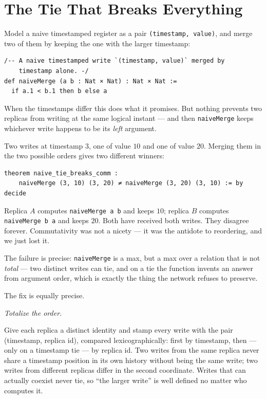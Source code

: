 \documentclass[12pt, a4paper, openright]{book}
\theoremstyle{thmstyle}
\theoremstyle{defstyle}
\newcommand{\lc}[1]{\texttt{#1}}
\newcounter{refutation}[chapter]
\renewcommand{\therefutation}{\thechapter.\arabic{refutation}}
\newenvironment{refutedbox}[1]{%
  \refstepcounter{refutation}%
  \begin{tcolorbox}[refutedbox,
    title={Refuted \therefutation\ --- #1}]%
}{\end{tcolorbox}}
\begin{document}
\section{The Tie That Breaks Everything}
\label{sec:lww-tie}

Model a naive timestamped register as a pair \lc{(timestamp, value)},
and merge two of them by keeping the one with the larger timestamp:

\begin{verbatim}
/-- A naive timestamped write `(timestamp, value)` merged by
    timestamp alone. -/
def naiveMerge (a b : Nat × Nat) : Nat × Nat :=
  if a.1 < b.1 then b else a
\end{verbatim}

When the timestamps differ this does what it promises. But nothing
prevents two replicas from writing at the same logical instant --- and
then \lc{naiveMerge} keeps whichever write happens to be its \emph{left}
argument.

\begin{refutedbox}{LWW merge with bare timestamps is commutative}
\label{ref:lww-tie}
  Two writes at timestamp $3$, one of value $10$ and one of value $20$.
  Merging them in the two possible orders gives two different winners:
\begin{verbatim}
theorem naive_tie_breaks_comm :
    naiveMerge (3, 10) (3, 20) ≠ naiveMerge (3, 20) (3, 10) := by decide
\end{verbatim}
  Replica $A$ computes \lc{naiveMerge a b} and keeps $10$; replica $B$
  computes \lc{naiveMerge b a} and keeps $20$. Both have received both
  writes. They disagree forever. Commutativity was not a nicety --- it
  was the antidote to reordering, and we just lost it.
\end{refutedbox}

The failure is precise: \lc{naiveMerge} is a max, but a max over a
relation that is not \emph{total} --- two distinct writes can tie, and on
a tie the function invents an answer from argument order, which is
exactly the thing the network refuses to preserve.

The fix is equally precise.

\emph{Totalize the order.}

Give each replica a distinct identity and stamp every write with the
pair (timestamp, replica id), compared lexicographically: first by
timestamp, then --- only on a timestamp tie --- by replica id. Two writes
from the same replica never share a timestamp position in its own
history without being the same write; two writes from different replicas
differ in the second coordinate. Writes that can actually coexist never
tie, so ``the larger write'' is well defined no matter who computes it.
\end{document}
